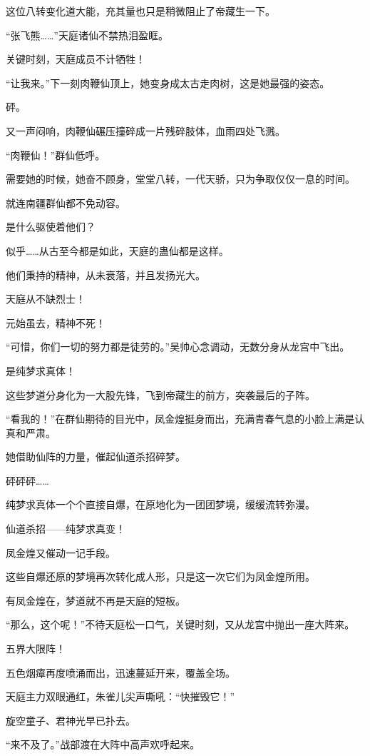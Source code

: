 \begin{this_body}
这位八转变化道大能，充其量也只是稍微阻止了帝藏生一下。

“张飞熊……”天庭诸仙不禁热泪盈眶。

关键时刻，天庭成员不计牺牲！

“让我来。”下一刻肉鞭仙顶上，她变身成太古走肉树，这是她最强的姿态。

砰。

又一声闷响，肉鞭仙碾压撞碎成一片残碎肢体，血雨四处飞溅。

“肉鞭仙！”群仙低呼。

需要她的时候，她奋不顾身，堂堂八转，一代天骄，只为争取仅仅一息的时间。

就连南疆群仙都不免动容。

是什么驱使着他们？

似乎……从古至今都是如此，天庭的蛊仙都是这样。

他们秉持的精神，从未衰落，并且发扬光大。

天庭从不缺烈士！

元始虽去，精神不死！

“可惜，你们一切的努力都是徒劳的。”吴帅心念调动，无数分身从龙宫中飞出。

是纯梦求真体！

这些梦道分身化为一大股先锋，飞到帝藏生的前方，突袭最后的子阵。

“看我的！”在群仙期待的目光中，凤金煌挺身而出，充满青春气息的小脸上满是认真和严肃。

她借助仙阵的力量，催起仙道杀招碎梦。

砰砰砰……

纯梦求真体一个个直接自爆，在原地化为一团团梦境，缓缓流转弥漫。

仙道杀招——纯梦求真变！

凤金煌又催动一记手段。

这些自爆还原的梦境再次转化成人形，只是这一次它们为凤金煌所用。

有凤金煌在，梦道就不再是天庭的短板。

“那么，这个呢！”不待天庭松一口气，关键时刻，又从龙宫中抛出一座大阵来。

五界大限阵！

五色烟瘴再度喷涌而出，迅速蔓延开来，覆盖全场。

天庭主力双眼通红，朱雀儿尖声嘶吼：“快摧毁它！”

旋空童子、君神光早已扑去。

“来不及了。”战部渡在大阵中高声欢呼起来。


\end{this_body}
